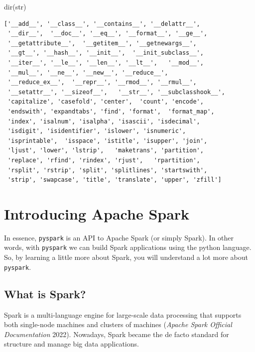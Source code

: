 \documentclass[
  11pt,
  letterpaper,
  DIV=11,
  numbers=noendperiod]{scrreprt}
\newenvironment{Shaded}{\begin{snugshade}}{\end{snugshade}}
\newcommand{\BuiltInTok}[1]{\textcolor[rgb]{0.00,0.23,0.31}{#1}}
\newcommand{\NormalTok}[1]{\textcolor[rgb]{0.00,0.23,0.31}{#1}}
\begin{document}
\begin{Shaded}
\begin{Highlighting}[]
\BuiltInTok{dir}\NormalTok{(}\BuiltInTok{str}\NormalTok{)}
\end{Highlighting}
\end{Shaded}

\begin{verbatim}
['__add__', '__class__', '__contains__', '__delattr__', 
 '__dir__',  '__doc__', '__eq__', '__format__', '__ge__', 
 '__getattribute__',  '__getitem__', '__getnewargs__', 
 '__gt__', '__hash__', '__init__',  '__init_subclass__', 
 '__iter__', '__le__', '__len__', '__lt__',   '__mod__', 
 '__mul__', '__ne__', '__new__', '__reduce__', 
 '__reduce_ex__',  '__repr__', '__rmod__', '__rmul__', 
 '__setattr__', '__sizeof__',   '__str__', '__subclasshook__', 
 'capitalize', 'casefold', 'center',  'count', 'encode', 
 'endswith', 'expandtabs', 'find', 'format',  'format_map', 
 'index', 'isalnum', 'isalpha', 'isascii', 'isdecimal',  
 'isdigit', 'isidentifier', 'islower', 'isnumeric', 
 'isprintable',  'isspace', 'istitle', 'isupper', 'join', 
 'ljust', 'lower', 'lstrip',   'maketrans', 'partition', 
 'replace', 'rfind', 'rindex', 'rjust',   'rpartition', 
 'rsplit', 'rstrip', 'split', 'splitlines', 'startswith',  
 'strip', 'swapcase', 'title', 'translate', 'upper', 'zfill']
\end{verbatim}


\chapter{Introducing Apache Spark}\label{sec-introd-spark}

In essence, \texttt{pyspark} is an API to Apache Spark (or simply
Spark). In other words, with \texttt{pyspark} we can build Spark
applications using the python language. So, by learning a little more
about Spark, you will understand a lot more about \texttt{pyspark}.

\section{What is Spark?}\label{what-is-spark}

Spark is a multi-language engine for large-scale data processing that
supports both single-node machines and clusters of machines
(\emph{Apache Spark Official Documentation} 2022). Nowadays, Spark
became the de facto standard for structure and manage big data
applications.
\end{document}
